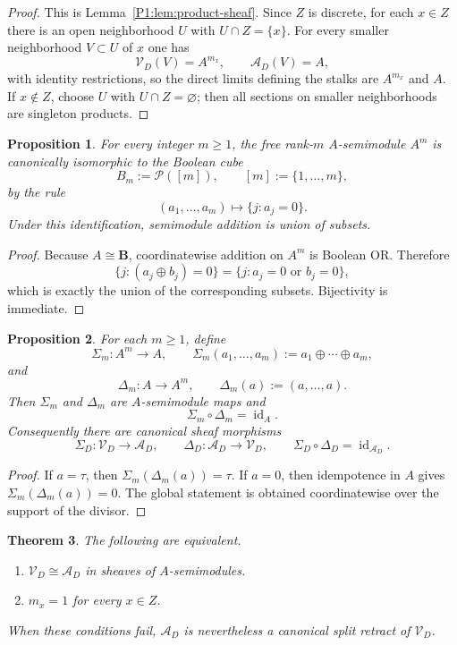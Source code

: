 \documentclass[11pt,a4paper]{article}
\numberwithin{equation}{section}
\newtheorem{theorem}{Theorem}[section]
\newtheorem{proposition}[theorem]{Proposition}
\theoremstyle{definition}
\theoremstyle{remark}
\newcommand{\BB}{\mathbf B}
\newcommand{\cP}{\mathcal P}
\newcommand{\cV}{\mathcal V}
\newcommand{\cA}{\mathcal A}
\newcommand{\taup}{\tau}
\begin{document}
\begin{proof}
This is Lemma~\ref{P1:lem:product-sheaf}.  Since $Z$ is discrete, for each $x\in Z$ there is an open neighborhood $U$ with $U\cap Z=\{x\}$.  For every smaller neighborhood $V\subset U$ of $x$ one has
\[
\cV_D(V)=A^{m_x},\qquad \cA_D(V)=A,
\]
with identity restrictions, so the direct limits defining the stalks are $A^{m_x}$ and $A$.  If $x\notin Z$, choose $U$ with $U\cap Z=\varnothing$; then all sections on smaller neighborhoods are singleton products.
\end{proof}

\begin{proposition}\label{P1:prop:boolean-cube}
For every integer $m\ge1$, the free rank-$m$ $A$-semimodule $A^m$ is canonically isomorphic to the Boolean cube
\[
B_m:=\cP([m]),\qquad [m]:=\{1,\dots,m\},
\]
by the rule
\[
(a_1,\dots,a_m)\longmapsto \{j:a_j=0\}.
\]
Under this identification, semimodule addition is union of subsets.
\end{proposition}

\begin{proof}
Because $A\cong\BB$, coordinatewise addition on $A^m$ is Boolean OR.  Therefore
\[
\{j:(a_j\oplus b_j)=0\}=\{j:a_j=0\text{ or }b_j=0\},
\]
which is exactly the union of the corresponding subsets.  Bijectivity is immediate.
\end{proof}

\begin{proposition}\label{P1:prop:retract-shadow}
For each $m\ge1$, define
\[
\Sigma_m:A^m\to A,
\qquad
\Sigma_m(a_1,\dots,a_m):=a_1\oplus\cdots\oplus a_m,
\]
and
\[
\Delta_m:A\to A^m,
\qquad
\Delta_m(a):=(a,\dots,a).
\]
Then $\Sigma_m$ and $\Delta_m$ are $A$-semimodule maps and
\[
\Sigma_m\circ\Delta_m=\operatorname{id}_A.
\]
Consequently there are canonical sheaf morphisms
\[
\Sigma_D:\cV_D\to\cA_D,
\qquad
\Delta_D:\cA_D\to\cV_D,
\qquad
\Sigma_D\circ\Delta_D=\operatorname{id}_{\cA_D}.
\]
\end{proposition}

\begin{proof}
If $a=\taup$, then $\Sigma_m(\Delta_m(a))=\taup$.  If $a=0$, then idempotence in $A$ gives $\Sigma_m(\Delta_m(a))=0$.  The global statement is obtained coordinatewise over the support of the divisor.
\end{proof}

\begin{theorem}\label{P1:thm:reduced-vs-multiplicity}
The following are equivalent.
\begin{enumerate}[label=(\roman*)]
\item $\cV_D\cong\cA_D$ in sheaves of $A$-semimodules.
\item $m_x=1$ for every $x\in Z$.
\end{enumerate}
When these conditions fail, $\cA_D$ is nevertheless a canonical split retract of $\cV_D$.
\end{theorem}
\end{document}
